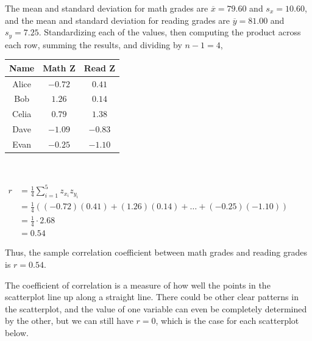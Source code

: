 \begin{example}
The mean and standard deviation for math grades are $\overline{x} = 79.60$ and $s_x = 10.60$, and the mean and standard deviation for reading grades are $\overline{y} = 81.00$ and $s_y = 7.25$. Standardizing each of the values, then computing the product across each row, summing the results, and dividing by $n-1 = 4$,

\begin{center}
\begin{minipage}{0.32\textwidth}
\renewcommand{\arraystretch}{1.25}
\begin{center}
\begin{tabular}{|c|c|c|}
\hline
Name & Math Z & Read Z \\
\hline
Alice & $-0.72$ & $0.41$ \\
\hline
Bob & $1.26$ & $0.14$  \\
\hline
Celia & $0.79$ & $1.38$  \\
\hline
Dave & $-1.09$ & $-0.83$  \\
\hline
Evan & $-0.25$ & $-1.10$  \\
\hline
\end{tabular}
\vspace*{0.1in}
\end{center}
\end{minipage}\ \ \begin{minipage}{0.55\textwidth}
$\begin{aligned}r &= \textstyle\frac{1}{4}\sum_{i=1}^{5}z_{x_i}z_{y_i} \\
&= \textstyle\frac{1}{4}\left((-0.72)(0.41)+(1.26)(0.14)+ \dots + (-0.25)(-1.10)\right) \\
&= \textstyle\frac{1}{4} \cdot 2.68 \\ &= 0.54 \end{aligned}$
\end{minipage}
\end{center}
Thus, the sample correlation coefficient between math grades and reading grades is $r = 0.54$.
\end{example}

\begin{keypoint}
The coefficient of correlation is a measure of how well the points in the scatterplot line up along a straight line. There could be other clear patterns in the scatterplot, and the value of one variable can even be completely determined by the other, but we can still have $r = 0$, which is the case for each scatterplot below.
\end{keypoint}

